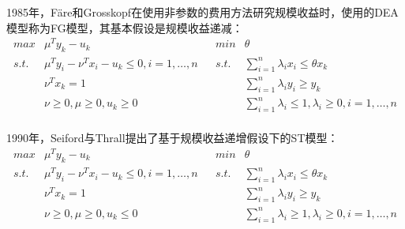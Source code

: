 1985年，F\"{a}re和Grosskopf\cite{fare1985nonparametric}在使用非参数的费用方法研究规模收益时，使用的DEA模型称为FG模型，其基本假设是规模收益递减：
\begin{equation}\label{eq:fg}
  \begin{array}{lllll}
    \textit{max} & \mu^T y_k - u_k & & \textit{min} & \theta\\
    \textit{s.t.} & \mu^T y_i - \nu^T x_i  - u_k \le 0, i = 1,\ldots, n & & \textit{s.t.} & \sum\limits_{i=1}^n \lambda_i x_i \le \theta x_k\\
    & \nu^T x_k = 1 & & & \sum\limits_{i=1}^n \lambda_i y_i \ge y_k\\
    & \nu \ge 0,\mu \ge 0, u_k \ge 0 & & & \sum\limits_{i=1}^n \lambda_i \le 1,\lambda_i \ge 0, i = 1,\ldots, n\\
  \end{array}
\end{equation}

1990年，Seiford与Thrall\cite{seiford1990recent}提出了基于规模收益递增假设下的ST模型：
\begin{equation}\label{eq:st}
  \begin{array}{lllll}
    \textit{max} & \mu^T y_k - u_k & & \textit{min} & \theta\\
    \textit{s.t.} & \mu^T y_i - \nu^T x_i  - u_k \le 0, i = 1,\ldots, n & & \textit{s.t.} & \sum\limits_{i=1}^n \lambda_i x_i \le \theta x_k\\
    & \nu^T x_k = 1 & & & \sum\limits_{i=1}^n \lambda_i y_i \ge y_k\\
    & \nu \ge 0,\mu \ge 0, u_k \le 0 & & & \sum\limits_{i=1}^n \lambda_i \ge 1,\lambda_i \ge 0, i = 1,\ldots, n\\
  \end{array}
\end{equation}


